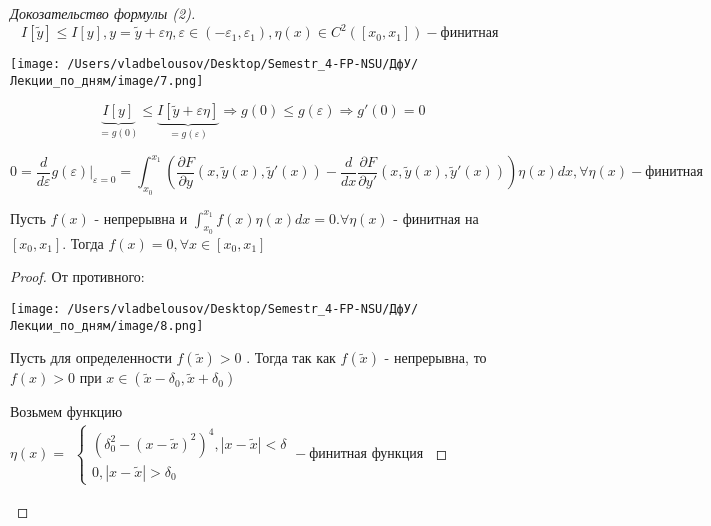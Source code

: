 \documentclass[12pt, a4paper]{report}
\begin{document}
\begin{proof}[Докозательство формулы (2)]
    \[ I[\tilde{y}] \le I[y] , y = \tilde{y} + \varepsilon \eta , \varepsilon \in  (- \varepsilon_1, \varepsilon_1), \eta(x) \in C^2([x_0,x_1])  - \text{финитная }    \] 
    
    \begin{center}
        \texttt{[image: /Users/vladbelousov/Desktop/Semestr\_4-FP-NSU/ДфУ/Лекции\_по\_дням/image/7.png]}
    \end{center}

    \[ \underbrace{I[y]}_{= g(0)} \le \underbrace{I[\tilde{y}+ \varepsilon \eta ]}_{=g(\varepsilon)} \Rightarrow g(0) \le g(\varepsilon) \Rightarrow g'( 0) = 0\] 

    \[ 0= \frac{d}{d \varepsilon} g(\varepsilon) |_{\varepsilon= 0 }= \int_{x_0}^{x_1} \left( \frac{\partial F }{\partial y } ( x , \tilde{y}(x) , \tilde{y }' (x) ) - \frac{d}{dx }  \frac{\partial F }{\partial y' } ( x , \tilde{y}(x) , \tilde{y }' (x) )  \right) \eta (x) dx , \forall \eta (x)  - \text{финитная}    \] 

    \begin{lemma}[Лагранжа]     
        Пусть \( f(x) \) - непрерывна и \( \displaystyle \int_{x_0}^{x_1} f(x) \eta (x) dx =0. \forall \eta (x) \) - финитная на \( [x_0,x_1] \). Тогда \( f(x) = 0 , \forall x \in  [x_0,x_1] \) 
    \end{lemma}

    \begin{proof}
        От противного:
        \begin{center}
            \texttt{[image: /Users/vladbelousov/Desktop/Semestr\_4-FP-NSU/ДфУ/Лекции\_по\_дням/image/8.png]}
        \end{center}
        Пусть для определенности \( f(\tilde{x } )> 0        \) . Тогда так как \( f(\tilde{x}) \) - непрерывна, то \( f(x)>0    \) при \( x \in (\tilde{x}- \delta_0, \tilde{x}+\delta_0) \) 

        Возьмем функцию \( \eta(x) = \begin{aligned}
            \begin{cases}
                (\delta_0 ^2 - (x- \tilde{x})^2) ^ 4 , |x- \tilde{x}|< \delta   \\
                0 , |x- \tilde{ x } | > \delta_0
                \end{cases}
                - \text{финитная функция} 
        \end{aligned}\)


\end{proof}
\end{proof}
\end{document}
